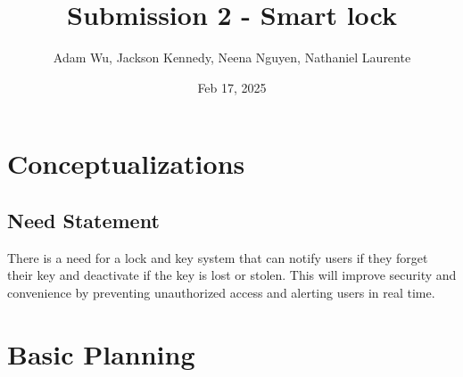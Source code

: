 \documentclass{article}
\title{Submission 2 - Smart lock} %
\author{Adam Wu, Jackson Kennedy, Neena Nguyen, Nathaniel Laurente}
\date{Feb 17, 2025}
\begin{document}
\maketitle

\tableofcontents
\newpage

\section{Conceptualizations}
\subsection{Need Statement}
There is a need for a lock and key system that can notify users if they forget their key and deactivate if the key is lost or stolen. This will improve security and convenience by preventing unauthorized access and alerting users in real time.





\newpage

\clearpage





\newpage
\section{Basic Planning}


\end{document}
